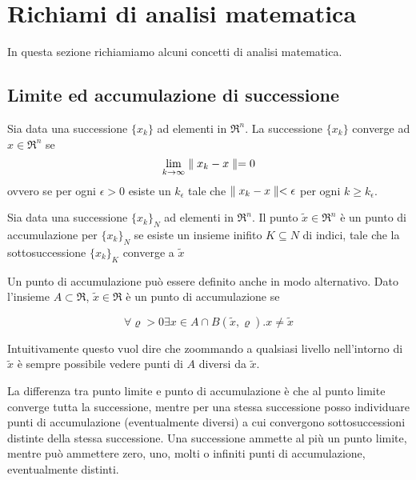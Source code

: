 \chapter{Richiami di analisi matematica}
\label{chp:foundations-mathematical-analysis}
In questa sezione richiamiamo alcuni concetti di analisi matematica.


\section{Limite ed accumulazione di successione}

\begin{definition}
	\label{dfn:succession-limit}
	Sia data una successione $\{x_{k}\}$ ad elementi in $\Re^{n}$. La successione $\{x_{k}\}$ converge ad $x\in\Re^{n}$ se
	\begin{equation}
	\label{eqn:succession-limit}
	\lim_{k\rightarrow\infty}\parallel x_{k}-x \parallel=0
	\end{equation}
	ovvero se per ogni $\epsilon>0$ esiste un $k_{\epsilon}$ tale che $\parallel x_{k}-x \parallel<\epsilon$ per ogni $k\geq k_{\epsilon}$.
\end{definition}

\begin{definition}
	\label{dfn:succession-accumulation}
	Sia data una successione $\{x_{k}\}_{N}$ ad elementi in $\Re^{n}$. Il punto $\tilde{x}\in\Re^{n}$ è un punto di accumulazione per $\{x_{k}\}_{N}$ se esiste un insieme inifito $K\subseteq N$ di indici, tale che la sottosuccessione $\{x_{k}\}_{K}$ converge a $\tilde{x}$
\end{definition}

Un punto di accumulazione può essere definito anche in modo alternativo.
Dato l'insieme $A\subset\Re$, $\tilde{x}\in\Re$ è un punto di accumulazione se

\begin{equation}
	\label{eqn:accumulation-point}
	\forall\varrho>0\exists x\in A\cap B(\tilde{x},\varrho).x\neq\tilde{x}
\end{equation}

Intuitivamente questo vuol dire che zoommando a qualsiasi livello nell'intorno di $\tilde{x}$ è sempre possibile vedere punti di $A$ diversi da $\tilde{x}$.

La differenza tra punto limite e punto di accumulazione è che al punto limite converge tutta la successione, mentre per una stessa successione posso individuare punti di accumulazione (eventualmente diversi) a cui convergono sottosuccessioni distinte della stessa successione. Una successione ammette al più un punto limite, mentre può ammettere zero, uno, molti o infiniti punti di accumulazione, eventualmente distinti.

